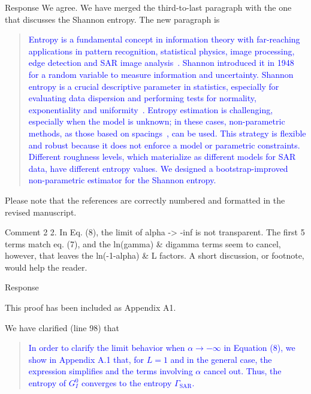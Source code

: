 \documentclass[11pt]{report}
\begin{document}
\begin{responsebox}{Response}
We agree.
We have merged the third-to-last paragraph with the one that discusses the Shannon entropy.
The new paragraph is
\begin{quote}
	\textcolor{blue}{Entropy is a fundamental concept in information theory with far-reaching applications in pattern recognition, statistical physics, image processing, edge detection and SAR image analysis~\cite{Presse2013,MohammadDjafari2015,Avval2021, Nascimento2014,Nascimento2019}. 
		Shannon introduced it in 1948~\cite{Shannon1948} for a random variable to measure information and uncertainty.
		Shannon entropy is a crucial descriptive parameter in statistics, especially for evaluating data dispersion and performing tests for normality, exponentiality and uniformity~\cite{Wieczorkowski1999,Zamanzade2012}. 
		Entropy estimation is challenging, especially when the model is unknown;
		in these cases, non-parametric methods, as those based on spacings~\cite{AlizadehNoughabi2010,Subhash2021}, can be used.
		This strategy is flexible and robust because it does not enforce a model or parametric constraints.
		Different roughness levels, which materialize as different models for SAR data, have different entropy values.
		We designed a bootstrap-improved non-parametric estimator for the Shannon entropy.}
\end{quote}
Please note that the references are correctly numbered and formatted in the revised manuscript.
\end{responsebox}

\begin{reviewbox}{Comment 2}
2. In Eq. (8), the limit of alpha -> -inf is not transparent. The first 5 terms match eq. (7), and the ln(gamma) \& digamma terms seem to cancel, however, that leaves the ln(-1-alpha) \& L factors. A short discussion, or footnote, would help the reader. 
\end{reviewbox}

\begin{responsebox}{Response}

This proof has been included as Appendix A1.

We have clarified (line 98) that
\begin{quote}
	\textcolor{blue}{
		In order to clarify the limit behavior when \(\alpha \to -\infty\) in Equation (8), we show in Appendix A.1 that, for \(L=1\) and in the general case, the expression simplifies and the terms involving \(\alpha\) cancel out. Thus, the entropy of \(G_I^0\) converges to the entropy \(\Gamma_{\text{SAR}}\).
}
\end{quote}

\end{responsebox}
\end{document}

